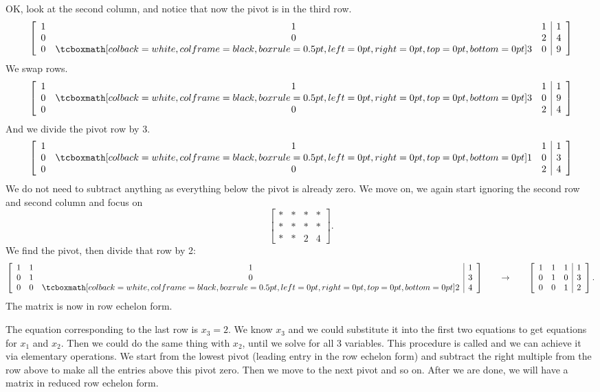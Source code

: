 OK\@, look at the second column, and notice that now the pivot is in the
third row.
\begin{equation*}
\left[
\begin{array}{ccc|c}
1 & 1 & 1 & 1 \\
0 & 0 & 2 & 4 \\
0 & \mybxsm{3} & 0 & 9
\end{array}
\right]
\end{equation*}
We swap rows.
\begin{equation*}
\left[
\begin{array}{ccc|c}
1 & 1 & 1 & 1 \\
0 & \mybxsm{3} & 0 & 9 \\
0 & 0 & 2 & 4
\end{array}
\right]
\end{equation*}
And we divide the pivot row by 3.
\begin{equation*}
\left[
\begin{array}{ccc|c}
1 & 1 & 1 & 1 \\
0 & \mybxsm{1} & 0 & 3 \\
0 & 0 & 2 & 4
\end{array}
\right]
\end{equation*}
We do not need to subtract anything as everything below the pivot is already
zero.  We move on, we again start ignoring the second row and second
column and focus on 
\begin{equation*}
\left[
\begin{array}{ccc|c}
* & * & * & * \\
* & * & * & * \\
* & * & 2 & 4
\end{array}
\right] .
\end{equation*}
We find the pivot, then divide that row by 2:
\begin{equation*}
\left[
\begin{array}{ccc|c}
1 & 1 & 1 & 1 \\
0 & 1 & 0 & 3 \\
0 & 0 & \mybxsm{2} & 4
\end{array}
\right] 
\qquad \to \qquad
\left[
\begin{array}{ccc|c}
1 & 1 & 1 & 1 \\
0 & 1 & 0 & 3 \\
0 & 0 & 1 & 2
\end{array}
\right] .
\end{equation*}
The matrix is now in row echelon form.

The equation corresponding to the last row is $x_3 = 2$.
We know $x_3$ and we
could substitute it into the first two equations to get equations for
$x_1$ and $x_2$.  Then we could do the same thing with $x_2$, until we solve
for all 3 variables.  This procedure is called
\emph{} and we can achieve it via elementary
operations.
We start from the lowest pivot (leading entry in the row
echelon form) and subtract the right multiple from the row above to
make all the entries above this pivot zero.
Then we move to the next pivot and so on.
After we are done, we will have a matrix in reduced row echelon form.

